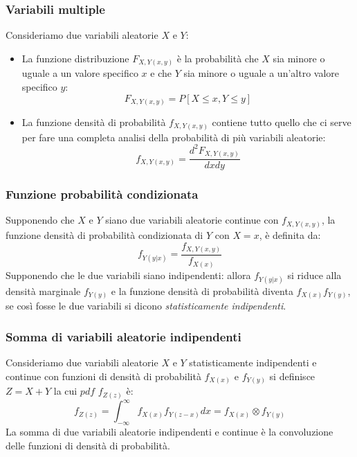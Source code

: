         \subsubsection{Variabili multiple}
            Consideriamo due variabili aleatorie $X$ e $Y$:
            \begin{itemize}
                \item {
                    La funzione distribuzione $F_{X,Y (x,y)}$ è la probabilità che $X$ sia minore o uguale a un valore specifico $x$ e che $Y$
                    sia minore o uguale a un'altro valore specifico $y$:
                    \[
                        F_{X,Y (x,y)} = P[X\leq x,Y\leq y]    
                    \]
                }
                \item {
                    La funzione densità di probabilità $f_{X,Y (x,y)}$ contiene tutto quello che ci serve per fare una completa analisi della probabilità
                    di più variabili aleatorie:
                    \[
                        f_{X,Y (x,y)} = \frac{d^2 F_{X,Y (x,y)}}{dxdy}     
                    \]

                }
            \end{itemize}
        \subsubsection{Funzione probabilità condizionata}
            Supponendo che $X$ e $Y$ siano due variabili aleatorie continue con $f_{X,Y (x,y)}$, la funzione densità di probabilità condizionata di $Y$ con $X=x$,
            è definita da:
            \[
                f_{Y (y|x)} = \frac{f_{X,Y (x,y)}}{f_{X(x)}}     
            \]
            Supponendo che le due variabili siano indipendenti: allora $f_{Y (y|x)}$ si riduce alla densità marginale $f_{Y (y)}$ e la funzione densità di
            probabilità diventa $f_{X (x)}f_{Y (y)}$, se così fosse le due variabili si dicono \emph{statisticamente indipendenti}.
        \subsubsection{Somma di variabili aleatorie indipendenti}
            Consideriamo due variabili aleatorie $X$ e $Y$ statisticamente indipendenti e continue con funzioni di densità di probabilità $f_{X (x)}$ e $f_{Y (y)}$ si 
            definisce $Z = X+Y$ la cui $pdf$ $f_{Z (z)}$ è:
            \[
                f_{Z (z)} = \int_{-\infty}^{\infty}f_{X (x)}f_{Y (z-x)} dx =  f_{X (x)} \otimes f_{Y (y)}
            \]
            La somma di due variabili aleatorie indipendenti e continue è la convoluzione delle funzioni di densità di probabilità.

